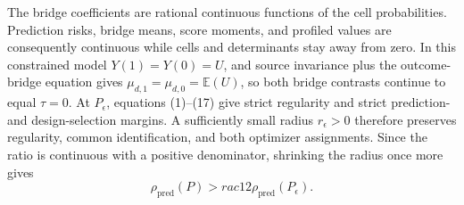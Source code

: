 The bridge coefficients are rational continuous functions of the cell probabilities. Prediction risks, bridge means, score moments, and profiled values are consequently continuous while cells and determinants stay away from zero. In this constrained model \(Y(1)=Y(0)=U\), and source invariance plus the outcome-bridge equation gives \(\mu_{d,1}=\mu_{d,0}=\mathbb E(U)\), so both bridge contrasts continue to equal \(\tau=0\). At \(P_\epsilon\), equations (1)--(17) give strict regularity and strict prediction- and design-selection margins. A sufficiently small radius \(r_\epsilon>0\) therefore preserves regularity, common identification, and both optimizer assignments. Since the ratio is continuous with a positive denominator, shrinking the radius once more gives
\[
 \rho_{\mathrm{pred}}(P)>rac12\rho_{\mathrm{pred}}(P_\epsilon).
\]